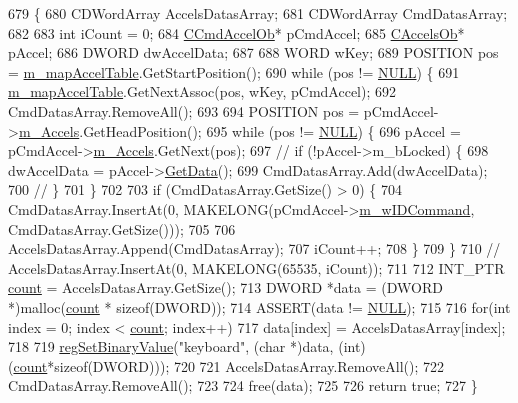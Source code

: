 \begin{DoxyCode}
679 \{
680   CDWordArray AccelsDatasArray;
681   CDWordArray CmdDatasArray;
682   
683   \textcolor{keywordtype}{int} iCount = 0;
684   \mbox{\hyperlink{class_c_cmd_accel_ob}{CCmdAccelOb}}* pCmdAccel;
685   \mbox{\hyperlink{class_c_accels_ob}{CAccelsOb}}* pAccel;
686   DWORD dwAccelData;
687   
688   WORD wKey;
689   POSITION pos = \mbox{\hyperlink{class_c_accelerator_manager_a16b8d3e9328bc0eeeb048630deff2768}{m\_mapAccelTable}}.GetStartPosition();
690   \textcolor{keywordflow}{while} (pos != \mbox{\hyperlink{getopt1_8c_a070d2ce7b6bb7e5c05602aa8c308d0c4}{NULL}}) \{
691     \mbox{\hyperlink{class_c_accelerator_manager_a16b8d3e9328bc0eeeb048630deff2768}{m\_mapAccelTable}}.GetNextAssoc(pos, wKey, pCmdAccel);
692     CmdDatasArray.RemoveAll();
693 
694     POSITION pos = pCmdAccel->\mbox{\hyperlink{class_c_cmd_accel_ob_a85772f1ea9204af42b8a39a0135dc0f8}{m\_Accels}}.GetHeadPosition();
695     \textcolor{keywordflow}{while} (pos != \mbox{\hyperlink{getopt1_8c_a070d2ce7b6bb7e5c05602aa8c308d0c4}{NULL}}) \{
696       pAccel = pCmdAccel->\mbox{\hyperlink{class_c_cmd_accel_ob_a85772f1ea9204af42b8a39a0135dc0f8}{m\_Accels}}.GetNext(pos);
697       \textcolor{comment}{//      if (!pAccel->m\_bLocked) \{}
698       dwAccelData = pAccel->\mbox{\hyperlink{class_c_accels_ob_abbbdc5e93061f67ade785c9e4f07b918}{GetData}}();
699       CmdDatasArray.Add(dwAccelData);
700       \textcolor{comment}{//      \}}
701     \}
702 
703     \textcolor{keywordflow}{if} (CmdDatasArray.GetSize() > 0) \{
704       CmdDatasArray.InsertAt(0, MAKELONG(pCmdAccel->\mbox{\hyperlink{class_c_cmd_accel_ob_aa3eb02dcd39ff14763fdefd8fabd7591}{m\_wIDCommand}}, CmdDatasArray.GetSize()));
705       
706       AccelsDatasArray.Append(CmdDatasArray);
707       iCount++;
708     \}
709   \}
710   \textcolor{comment}{//  AccelsDatasArray.InsertAt(0, MAKELONG(65535, iCount));}
711   
712   INT\_PTR \mbox{\hyperlink{expr_8cpp_a16ff2d8e15ade4948398b0aeb80124a8}{count}} = AccelsDatasArray.GetSize();
713   DWORD *data = (DWORD *)malloc(\mbox{\hyperlink{expr_8cpp_a16ff2d8e15ade4948398b0aeb80124a8}{count}} * \textcolor{keyword}{sizeof}(DWORD));
714   ASSERT(data != \mbox{\hyperlink{getopt1_8c_a070d2ce7b6bb7e5c05602aa8c308d0c4}{NULL}});
715 
716   \textcolor{keywordflow}{for}(\textcolor{keywordtype}{int} index = 0; index < \mbox{\hyperlink{expr_8cpp_a16ff2d8e15ade4948398b0aeb80124a8}{count}}; index++)
717     data[index] = AccelsDatasArray[index];
718 
719   \mbox{\hyperlink{_reg_8cpp_a353479c95a247e54f069cc5eb4cd3536}{regSetBinaryValue}}(\textcolor{stringliteral}{"keyboard"}, (\textcolor{keywordtype}{char} *)data, (\textcolor{keywordtype}{int})(\mbox{\hyperlink{expr_8cpp_a16ff2d8e15ade4948398b0aeb80124a8}{count}}*\textcolor{keyword}{sizeof}(DWORD)));
720 
721   AccelsDatasArray.RemoveAll();
722   CmdDatasArray.RemoveAll();
723 
724   free(data);
725 
726   \textcolor{keywordflow}{return} \textcolor{keyword}{true};
727 \}
\end{DoxyCode}
